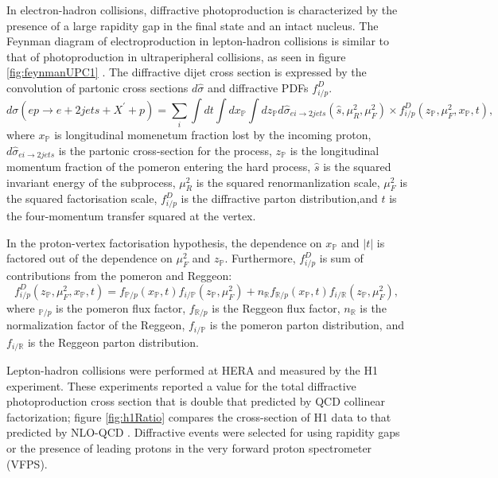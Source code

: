 In electron-hadron collisions, diffractive photoproduction is characterized by the presence of a large rapidity gap in the final state and an intact nucleus. The Feynman diagram of electroproduction in lepton-hadron collisions is similar to that of photoproduction in ultraperipheral collisions, as seen in figure \ref{fig:feynmanUPC1} \cite{Andreev:2015cwa}. The diffractive dijet cross section is expressed by the convolution of partonic cross sections $d\hat{\sigma}$ and diffractive PDFs $f^D_{i/p}$.
\begin{equation}
d\sigma (ep \rightarrow e + 2 jets + X^{'} + p) = \sum_{i} \int dt \int dx_\mathbb{P} \int dz_\mathbb{P}d\hat{\sigma}_{ei\rightarrow 2jets}(\hat{s},\mu^2_R,\mu^2_F)\times f^D_{i/p}(z_\mathbb{P},\mu^2_F,x_\mathbb{P},t) ,
\end{equation}
where $x_\mathbb{P}$ is longitudinal momenetum fraction lost by the incoming proton, $d\hat{\sigma}_{ei\rightarrow 2jets}$ is the partonic cross-section for the process, $z_\mathbb{P}$ is the longitudinal momentum fraction of the pomeron entering the hard process, $\hat{s}$ is the squared invariant energy of the subprocess, $\mu^2_R$ is the squared renormanlization scale, $\mu^2_F$ is the squared factorisation scale, $f^D_{i/p}$ is the diffractive parton distribution,and $t$ is the four-momentum transfer squared at the vertex. 

In the proton-vertex factorisation hypothesis, the dependence on $x_{\mathbb{P}}$ and $|t|$ is factored out of the dependence on $\mu^2_F$ and $z_{\mathbb{P}}$. Furthermore, $f^D_{i/p}$ is sum of contributions from the pomeron and Reggeon:
\begin{equation}
f^D_{i/p}(z_{\mathbb{P}},\mu^2_F,x_{\mathbb{P}},t) = f_{\mathbb{P}/p}(x_{\mathbb{P}},t)f_{i/\mathbb{P}}(z_{\mathbb{P}},\mu^2_F) + n_\mathbb{R}f_{\mathbb{R}/p}(x_{\mathbb{P}},t)f_{i/\mathbb{R}}(z_{\mathbb{P}},
\mu^2_F) ,
\end{equation}
where $_{\mathbb{P}/p}$ is the pomeron flux factor, $f_{\mathbb{R}/p}$ is the Reggeon flux factor, $n_\mathbb{R}$ is the normalization factor of the Reggeon, $f_{i/\mathbb{P}}$ is the pomeron parton distribution, and $f_{i/\mathbb{R}}$ is the Reggeon parton distribution.

Lepton-hadron collisions were performed at HERA and measured by the H1 experiment. These experiments reported a value for the total diffractive photoproduction cross section that is double that predicted by QCD collinear factorization; figure \ref{fig:h1Ratio} compares the cross-section of H1 data to that predicted by NLO-QCD \cite{Andreev:2015cwa}. Diffractive events were selected for using rapidity gaps or the presence of leading protons in the very forward proton spectrometer (VFPS). 

